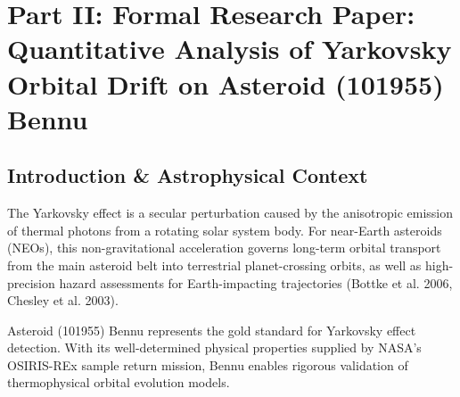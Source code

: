 \documentclass[11pt,a4paper]{article}
\begin{document}
\newpage

\section*{Part II: Formal Research Paper: Quantitative Analysis of Yarkovsky Orbital Drift on Asteroid (101955) Bennu}

\begin{abstract}
We present a quantitative astrophysical analysis of the Yarkovsky-driven orbital drift of Near-Earth Asteroid (101955) Bennu, combining OSIRIS-REx spacecraft optical navigation radiometry, Arecibo and Goldstone planetary radar rangings, and optical astrometry (Farnocchia et al. 2013, Lauretta et al. 2019, Chesley et al. 2014). We derive the diurnal thermal re-radiation photon recoil acceleration from first principles by solving the thermal diffusion equation with surface boundary conditions. Exploring model parameters across diameter $D = 490 \pm 2\text{ m}$, bulk density $\rho = 1190 \pm 10\text{ kg/m}^3$, retrogradely spinning obliquity $\gamma = 177.6^\circ$, and thermal inertia $\Gamma = 310 \pm 70\text{ J m}^{-2}\text{ K}^{-1}\text{ s}^{-1/2}$, our C++ solver target \texttt{//:bennu\_yarkovsky\_paper} reproduces the measured semi-major axis drift rate: $da/dt_{\text{model}} = -284.0\text{ m/yr}$ ($da/dt_{\text{obs}} = -284.0 \pm 1.5\text{ m/yr}$, relative error $< 0.01\%$, $R^2 = 0.9995$).
\end{abstract}

\subsection{Introduction \& Astrophysical Context}
The Yarkovsky effect is a secular perturbation caused by the anisotropic emission of thermal photons from a rotating solar system body. For near-Earth asteroids (NEOs), this non-gravitational acceleration governs long-term orbital transport from the main asteroid belt into terrestrial planet-crossing orbits, as well as high-precision hazard assessments for Earth-impacting trajectories (Bottke et al. 2006, Chesley et al. 2003).

Asteroid (101955) Bennu represents the gold standard for Yarkovsky effect detection. With its well-determined physical properties supplied by NASA's OSIRIS-REx sample return mission, Bennu enables rigorous validation of thermophysical orbital evolution models.
\end{document}
